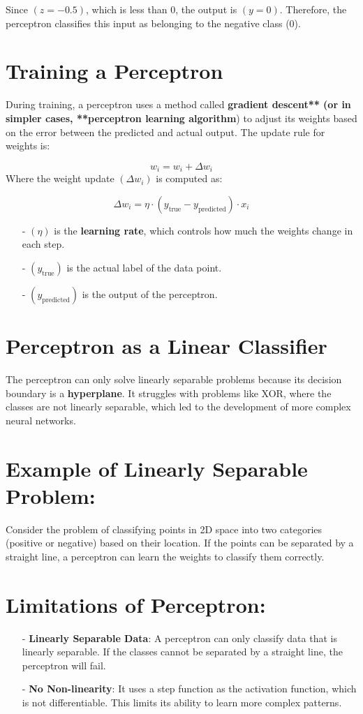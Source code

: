 \documentclass[10pt]{article}
\begin{document}
Since $(z = -0.5)$, which is less than 0, the output is $(y = 0)$. Therefore, the perceptron classifies this input as belonging to the negative class (0).

\section{ Training a Perceptron}
During training, a perceptron uses a method called {\bf gradient descent** (or in simpler cases, **perceptron learning algorithm}) to adjust its weights based on the error between the predicted and actual output. The update rule for weights is:

$$
w_i = w_i + \Delta w_i
$$
Where the weight update $(\Delta w_i)$ is computed as:

$$
\Delta w_i = \eta \cdot (y_{\text{true}} - y_{\text{predicted}}) \cdot x_i
$$

\begin{itemize}
   \item [-] $(\eta)$ is the {\bf learning rate}, which controls how much the weights change in each step.
   \item [-] $(y_{\text{true}})$ is the actual label of the data point.
   \item [-] $(y_{\text{predicted}})$ is the output of the perceptron.
\end{itemize}

\section{ Perceptron as a Linear Classifier}
The perceptron can only solve linearly separable problems because its decision boundary is a {\bf hyperplane}. It struggles with problems like XOR, where the classes are not linearly separable, which led to the development of more complex neural networks.

\section{ Example of Linearly Separable Problem:}
Consider the problem of classifying points in 2D space into two categories (positive or negative) based on their location. If the points can be separated by a straight line, a perceptron can learn the weights to classify them correctly.

\section{ Limitations of Perceptron:}
\begin{itemize}
   \item [-] {\bf Linearly Separable Data}: A perceptron can only classify data that is linearly separable. If the classes cannot be separated by a straight line, the perceptron will fail.
   \item [-] {\bf No Non-linearity}: It uses a step function as the activation function, which is not differentiable. This limits its ability to learn more complex patterns.
\end{itemize}
\end{document}
